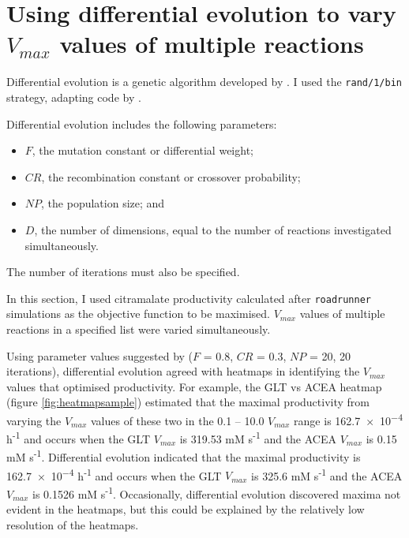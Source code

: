 \documentclass[parskip=full, numbers=noenddot]{scrreprt}
\begin{document}
\section{Using differential evolution to vary $V_{max}$ values of multiple reactions}
\label{sec:de}

Differential evolution is a genetic algorithm developed by \citet{storn_differential_1997}. I used the \texttt{rand/1/bin} strategy, adapting code by \citet{mier_tutorial_2017, mier_small_2017}.

Differential evolution includes the following parameters:
\begin{itemize}
\item $F$, the mutation constant or differential weight;
\item $CR$, the recombination constant or crossover probability;
\item $NP$, the population size; and
  \item $D$, the number of dimensions, equal to the number of reactions investigated simultaneously.
\end{itemize}
The number of iterations must also be specified.

In this section, I used citramalate productivity calculated after \texttt{roadrunner} simulations as the objective function to be maximised. $V_{max}$ values of multiple reactions in a specified list were varied simultaneously.

Using parameter values suggested by \citet{storn_differential_1997} ($F$ = 0.8, $CR$ = 0.3, $NP$ = 20, 20 iterations), differential evolution agreed with heatmaps in identifying the $V_{max}$ values that optimised productivity.
For example, the GLT vs ACEA heatmap (figure \ref{fig:heatmapsample}) estimated that the maximal productivity from varying the $V_{max}$ values of these two in the 0.1 -- 10.0 $V_{max}$ range is \num{162.7e-4} h\textsuperscript{-1} and occurs when the GLT $V_{max}$ is 319.53 mM s\textsuperscript{-1} and the ACEA $V_{max}$ is 0.15 mM s\textsuperscript{-1}. Differential evolution indicated that the maximal productivity is \num{162.7e-4} h\textsuperscript{-1} and occurs when the GLT $V_{max}$ is 325.6 mM s\textsuperscript{-1} and the ACEA $V_{max}$ is 0.1526 mM s\textsuperscript{-1}.
Occasionally, differential evolution discovered maxima not evident in the heatmaps, but this could be explained by the relatively low resolution of the heatmaps. 
\end{document}
